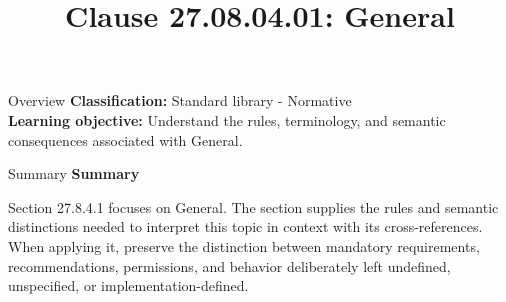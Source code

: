 \documentclass[10pt,letterpaper]{article}
\title{Clause 27.08.04.01: General}
\author{}
\date{}
\begin{document}
\maketitle
\begin{CornellOverviewBox}{Overview}
\textbf{Classification:} Standard library - Normative\\[2pt]
\textbf{Learning objective:} Understand the rules, terminology, and semantic consequences associated with General.
\end{CornellOverviewBox}\begin{CornellSummaryBox}{Summary}
{\sffamily\bfseries\color{Accent} Summary}\par\vspace{3pt}Section 27.8.4.1 focuses on General. The section supplies the rules and semantic distinctions needed to interpret this topic in context with its cross-references. When applying it, preserve the distinction between mandatory requirements, recommendations, permissions, and behavior deliberately left undefined, unspecified, or implementation-defined.
\end{CornellSummaryBox}
\end{document}
